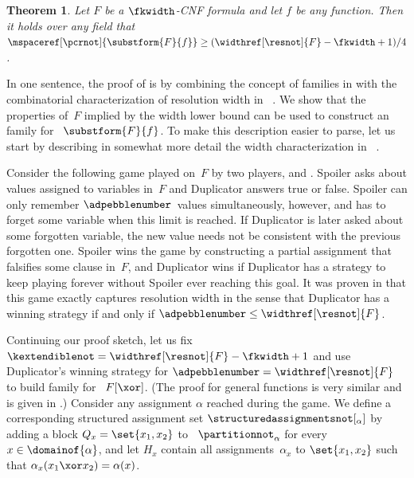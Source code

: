 \documentclass[11pt]{article}
\numberwithin{equation}{section}
\newtheorem{theorem}{Theorem}[section]
\theoremstyle{definition}
\theoremstyle{plain}
\begin{document}
\begin{theorem}
  \label{thm:substitution}
  Let $F$ be a $\fkwidth$-CNF formula
  and let $f$ be any
  \nonauthor{} function. 
  Then it  holds over any field that
  $\mspaceref[\pcrnot]{\substform{F}{f}}
  \geq
  (\widthref[\resnot]{F} -  \fkwidth  + 1) /  4$.

\end{theorem}

\begin{ourproof}[sketch]
  In one sentence, the proof of
  is by combining the concept of
  \kextendibleNok families in
  with the combinatorial  characterization of resolution width in~%
  \cite{AD08CombinatoricalCharacterization}.
  We show that the  properties of~$F$ implied by the
  width lower bound  can be used to construct an \kextendibleNok family for~%
  $\substform{F}{f}$.
  To make this description easier to parse,
  let us start by describing in somewhat more detail the width
  characterization in~%
  \cite{AD08CombinatoricalCharacterization}.
  
  Consider the following game played on~$F$
  by two players, %
   and . 
  Spoiler asks about values assigned to variables in~$F$ and
  Duplicator answers true or false. Spoiler can only remember 
  $\adpebblenumber$~values
  simultaneously, however, and has to forget some variable when this limit is 
  reached.
  If Duplicator is later asked about some forgotten variable,
  the new value needs not be consistent with the previous
  forgotten one. Spoiler wins the game by constructing a partial
  assignment that falsifies some clause in~$F$, and
  Duplicator wins 
  if %
  Duplicator has  %
  a strategy to keep playing forever without
  Spoiler ever reaching this goal. It was proven in
  \cite{AD08CombinatoricalCharacterization}
  that this game exactly captures resolution
  width in the sense that Duplicator has a winning strategy if and only if
  $\adpebblenumber \leq \widthref[\resnot]{F}$.

  Continuing our proof sketch, let us fix
  $\kextendiblenot=\widthref[\resnot]{F} - \fkwidth + 1$
  and  use Duplicator's winning strategy for
  $\adpebblenumber = \widthref[\resnot]{F}$
  to build \akextendible family for~%
  $F[\xor]$.  (The proof  %
  for general \nonauthor{} functions is very similar and is given in
   .)   %
  Consider any assignment $\alpha$ reached during the
  game. We define a corresponding structured assignment set
  $\structuredassignmentsnot[_\alpha]$
  by adding a block
  $Q_{x}=\set{x_{1},x_{2}}$
  to~%
%
  $\partitionnot_\alpha$
  for every $x \in \domainof{\alpha}$,
  and let $H_{x}$ 
  contain all assignments~$\alpha_x$ to
  $\set{x_{1},x_{2}}$
  such that
  $\alpha_x (x_1 \xor x_2)  =  \alpha(x)$.


\end{ourproof}
\end{document}
